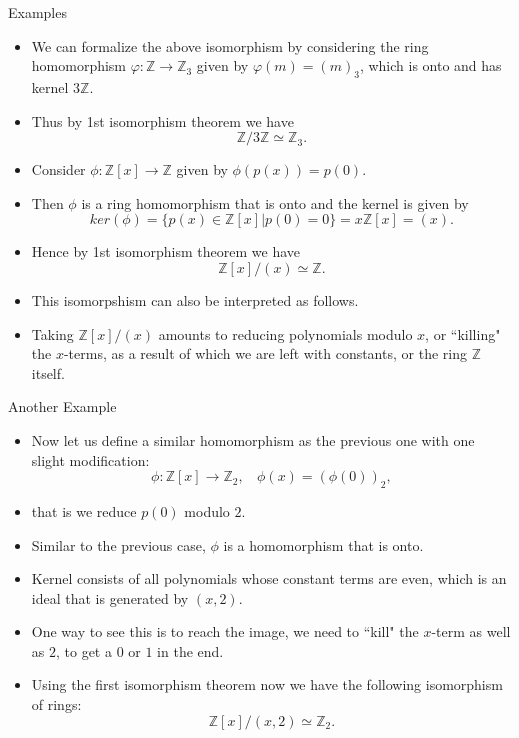 \documentclass[ %
 10pt, xcolor={dvipsnames,svgnames,x11names,hyperref},
   hyperref={colorlinks=true,citecolor=green,linkcolor=DarkRed,urlcolor=ProcessBlue,anchorcolor=blue}
  ]{beamer}
\newenvironment{stepitemize}{\begin{itemize}[<+->]}{\end{itemize} }
\newcommand{\Z}{\mathbb{Z}}
\begin{document}
\begin{frame}{Examples}
    \begin{stepitemize}
        \item We can formalize the above isomorphism by considering the ring homomorphism $\varphi:\Z\rightarrow \Z_3$ given by $\varphi(m) = (m)_3$, which is onto and has kernel $3\Z$. 
        \item Thus by 1st isomorphism theorem we have
    $$\Z/3\Z \simeq \Z_3.$$
    \item Consider $\phi:\Z[x]\rightarrow \Z$ given by $\phi(p(x)) = p(0)$. 
    \item Then $\phi$ is a ring homomorphism that is onto and the kernel is given by 
    $$ker(\phi) = \{p(x) \in \Z[x]|p(0)=0\} = x\Z[x] = (x).$$
    \item Hence by 1st isomorphism theorem we have 
    $$\Z[x]/(x) \simeq \Z.$$
\item This isomorpshism can also be interpreted as follows. 
\item Taking $\Z[x]/(x)$ amounts to reducing polynomials modulo $x$, or ``killing" the $x$-terms, as a result of which we are left with constants, or the ring $\Z$ itself. 
    \end{stepitemize}
\end{frame}
\begin{frame}{Another Example}
\begin{stepitemize}
    \item Now let us define a similar homomorphism as the previous one with one slight modification:
$$\phi:\Z[x]\rightarrow \Z_2, \:\:\:\: \phi(x) = (\phi(0))_2,$$
\item that is we reduce $p(0)$ modulo $2$. 
\item Similar to the previous case, $\phi$ is a homomorphism that is onto. 
\item Kernel consists of all polynomials whose constant terms are even, which is an ideal that is generated by $(x,2)$. 
\item One way to see this is to reach the image, we need to ``kill" the $x$-term as well as $2$, to get a $0$ or $1$ in the end. 
\item Using the first isomorphism theorem now we have the following isomorphism of rings:
    $$\Z[x]/(x,2) \simeq \Z_2.$$
\end{stepitemize}
\end{frame}
\end{document}
